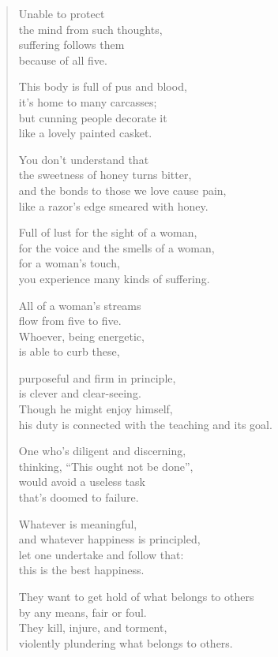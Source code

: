 \documentclass[12pt,openany]{book}%
\begin{document}
\begin{verse}
Unable to protect \\
the mind from such thoughts, \\
suffering follows them \\
because of all five. 

This body is full of pus and blood, \\
it’s home to many carcasses; \\
but cunning people decorate it \\
like a lovely painted casket. 

You don’t understand that \\
the sweetness of honey turns bitter, \\
and the bonds to those we love cause pain, \\
like a razor’s edge smeared with honey. 

Full of lust for the sight of a woman, \\
for the voice and the smells of a woman, \\
for a woman’s touch, \\
you experience many kinds of suffering. 

All of a woman’s streams \\
flow from five to five. \\
Whoever, being energetic, \\
is able to curb these, 

purposeful and firm in principle, \\
is clever and clear-seeing. \\
Though he might enjoy himself, \\
his duty is connected with the teaching and its goal. 

One who’s diligent and discerning, \\
thinking, “This ought not be done”, \\
would avoid a useless task \\
that’s doomed to failure. 

Whatever is meaningful, \\
and whatever happiness is principled, \\
let one undertake and follow that: \\
this is the best happiness. 

They want to get hold of what belongs to others \\
by any means, fair or foul. \\
They kill, injure, and torment, \\
violently plundering what belongs to others. 


\end{verse}
\end{document}
